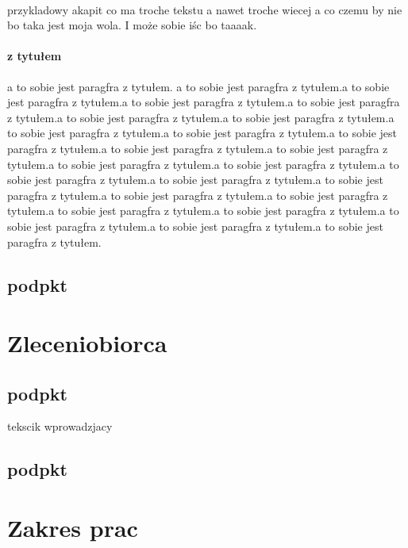 \documentclass[a4paper,10pt]{article}
\begin{document}
\paragraph{}
przykladowy akapit co ma troche tekstu a nawet troche wiecej a co czemu by nie bo taka jest moja wola. I może sobie iśc bo taaaak.
\paragraph{z tytułem}
a to sobie jest paragfra z tytułem. a to sobie jest paragfra z tytułem.a to sobie jest
 paragfra z tytułem.a to sobie jest paragfra z tytułem.a to sobie jest paragfra z tytułem.a 
to sobie jest paragfra z tytułem.a to sobie jest paragfra z tytułem.a to sobie jest paragfra 
z tytułem.a to sobie jest paragfra z tytułem.a to sobie jest paragfra z tytułem.a to sobie 
jest paragfra z tytułem.a to sobie jest paragfra z tytułem.a to sobie jest paragfra z tytułem.a to sobie jest paragfra z tytułem.a to sobie jest paragfra z tytułem.a to sobie jest paragfra z tytułem.a to sobie jest paragfra z tytułem.a to sobie jest paragfra z tytułem.a to sobie jest paragfra z tytułem.a to sobie jest paragfra z tytułem.a to sobie jest paragfra z tytułem.a to sobie jest paragfra z tytułem.a to sobie jest paragfra z tytułem.a to sobie jest paragfra z tytułem.
\subsection{podpkt}

\section{Zleceniobiorca}
\subsection{podpkt}
tekscik wprowadzjacy \cite{historia}

\subsection{podpkt}

\section{Zakres prac}

\clearpage
{}
{}

\end{document}

